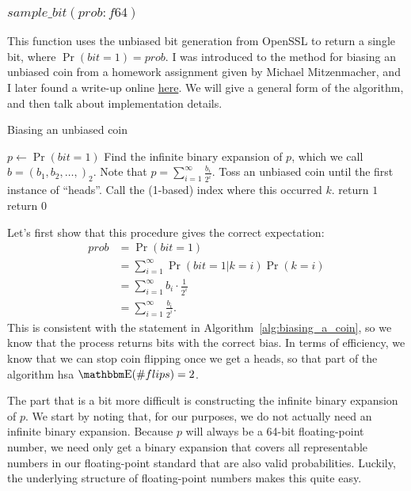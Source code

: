 \documentclass[11pt]{scrartcl} %
\begin{document}
\subsubsection{$sample\_bit(prob: f64)$}
This function uses the unbiased bit generation from OpenSSL to return a single bit, where $\Pr(bit = 1) = prob$.
I was introduced to the method for biasing an unbiased coin from a homework assignment given by Michael Mitzenmacher,
and I later found a write-up online \href{https://amakelov.wordpress.com/2013/10/10/arbitrarily-biasing-a-coin-in-2-expected-tosses/}{here}.
We will give a general form of the algorithm, and then talk about implementation details.
\begin{algorithm}[H]
	\caption{Biasing an unbiased coin}
	\label{alg:biasing_a_coin}
	\begin{algorithmic}[1]
		\State $p \gets \Pr(bit = 1)$
		\State Find the infinite binary expansion of $p$, which we call $b = (b_1, b_2, \hdots,)_2$.
		Note that $p = \sum_{i=1}^{\infty}\frac{b_i}{2^i}$.
		\State Toss an unbiased coin until the first instance of ``heads''. Call the (1-based) index where this occurred $k$.
			\State return $1$
		\Else
			\State return $0$
		\EndIf
	\end{algorithmic}
\end{algorithm}
Let's first show that this procedure gives the correct expectation:
\begin{align*}
	prob &= \Pr(bit = 1) \\
		 &= \sum_{i=1}^{\infty} \Pr(bit = 1 \vert k = i) \Pr(k = i) \\
		 &= \sum_{i=1}^{\infty} b_i \cdot \frac{1}{2^i} \\
		 &= \sum_{i=1}^{\infty}\frac{b_i}{2^i}.
\end{align*}
This is consistent with the statement in Algorithm~\ref{alg:biasing_a_coin}, so we know that
the process returns bits with the correct bias.
In terms of efficiency, we know that we can stop coin flipping once we get a heads,
so that part of the algorithm hsa $\E(\# flips) = 2$. \newline

The part that is a bit more difficult is constructing the infinite binary expansion of $p$.
We start by noting that, for our purposes, we do not actually need an infinite binary expansion.
Because $p$ will always be a 64-bit floating-point number, we need only get a binary
expansion that covers all representable numbers in our floating-point standard that are
also valid probabilities.
Luckily, the underlying structure of floating-point numbers makes this quite easy. \newline
\end{document}
